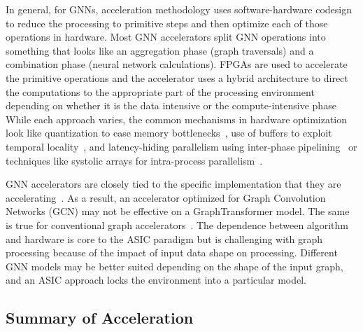 In general, for GNNs, acceleration methodology uses software-hardware codesign to reduce the processing to primitive steps and then optimize each of those operations in hardware. 
Most GNN accelerators split GNN operations into something that looks like an aggregation phase (graph traversals) and a combination phase (neural network calculations).
FPGAs are used to accelerate the primitive operations and the accelerator uses a hybrid architecture to direct the computations to the appropriate part of the processing environment depending on whether it is the data intensive or the compute-intensive phase~\cite{Kiningham2022, Zhang2023, Yan2020, Lin2023, Zhang2023b, Lin2024}
While each approach varies, the common mechanisms in hardware optimization look like quantization to ease memory bottlenecks~\cite{Zhu2023, Zhong2023}, use of buffers to exploit temporal locality~\cite{Chen2022, Zhang2023a, Chen2023, Zhong2023}, and latency-hiding parallelism using inter-phase pipelining~\cite{Kiningham2022} or techniques like systolic arrays for intra-process parallelism~\cite{Yan2020}.

GNN accelerators are closely tied to the specific implementation that they are accelerating~\cite{Abi2023}. 
As a result, an accelerator optimized for Graph Convolution Networks (GCN) may not be effective on a GraphTransformer model.
The same is true for conventional graph accelerators~\cite{Dadu2021}.
The dependence between algorithm and hardware is core to the ASIC paradigm but is challenging with graph processing because of the impact of input data shape on processing. 
Different GNN models may be better suited depending on the shape of the input graph, and an ASIC approach locks the environment into a particular model. 

\subsection{Summary of \gai Acceleration}



